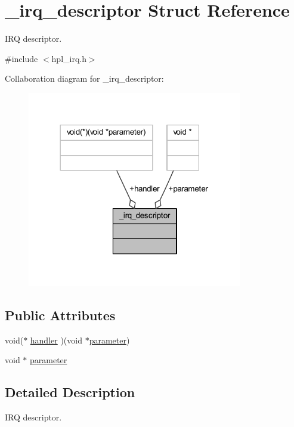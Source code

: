 \hypertarget{struct__irq__descriptor}{}\section{\+\_\+irq\+\_\+descriptor Struct Reference}
\label{struct__irq__descriptor}


I\+RQ descriptor.  




{\ttfamily \#include $<$hpl\+\_\+irq.\+h$>$}



Collaboration diagram for \+\_\+irq\+\_\+descriptor\+:
\nopagebreak
\begin{figure}[H]
\begin{center}
\leavevmode
\includegraphics[width=266pt]{struct__irq__descriptor__coll__graph}
\end{center}
\end{figure}
\subsection*{Public Attributes}
\begin{DoxyCompactItemize}
\item 
void($\ast$ \hyperlink{struct__irq__descriptor_a5c5645efb32460ff3105eff8e6206b91}{handler} )(void $\ast$\hyperlink{struct__irq__descriptor_a9c58c3f373aebb6b725b9b47def981fd}{parameter})
\item 
void $\ast$ \hyperlink{struct__irq__descriptor_a9c58c3f373aebb6b725b9b47def981fd}{parameter}
\end{DoxyCompactItemize}


\subsection{Detailed Description}
I\+RQ descriptor. 

